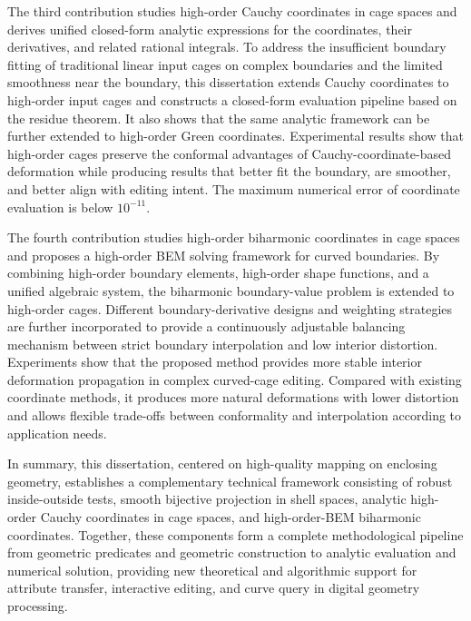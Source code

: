 \begin{abstract*}
The third contribution studies high-order Cauchy coordinates in cage spaces and derives unified closed-form analytic expressions for the coordinates, their derivatives, and related rational integrals. To address the insufficient boundary fitting of traditional linear input cages on complex boundaries and the limited smoothness near the boundary, this dissertation extends Cauchy coordinates to high-order input cages and constructs a closed-form evaluation pipeline based on the residue theorem. It also shows that the same analytic framework can be further extended to high-order Green coordinates. Experimental results show that high-order cages preserve the conformal advantages of Cauchy-coordinate-based deformation while producing results that better fit the boundary, are smoother, and better align with editing intent. The maximum numerical error of coordinate evaluation is below $10^{-11}$.

The fourth contribution studies high-order biharmonic coordinates in cage spaces and proposes a high-order BEM solving framework for curved boundaries. By combining high-order boundary elements, high-order shape functions, and a unified algebraic system, the biharmonic boundary-value problem is extended to high-order cages. Different boundary-derivative designs and weighting strategies are further incorporated to provide a continuously adjustable balancing mechanism between strict boundary interpolation and low interior distortion. Experiments show that the proposed method provides more stable interior deformation propagation in complex curved-cage editing. Compared with existing coordinate methods, it produces more natural deformations with lower distortion and allows flexible trade-offs between conformality and interpolation according to application needs.

In summary, this dissertation, centered on high-quality mapping on enclosing geometry, establishes a complementary technical framework consisting of robust inside-outside tests, smooth bijective projection in shell spaces, analytic high-order Cauchy coordinates in cage spaces, and high-order-BEM biharmonic coordinates. Together, these components form a complete methodological pipeline from geometric predicates and geometric construction to analytic evaluation and numerical solution, providing new theoretical and algorithmic support for attribute transfer, interactive editing, and curve query in digital geometry processing.
\end{abstract*}
